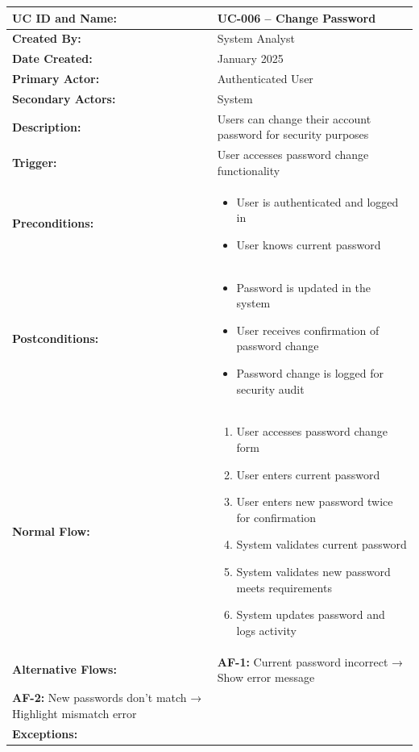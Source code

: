 \documentclass[12pt,a4paper]{article}
\begin{document}
\renewcommand{\arraystretch}{1.5}
\begin{longtable}{|p{4.5cm}|p{10.5cm}|}
\hline
\textbf{UC ID and Name:} & UC-006 – Change Password \\
\hline
\textbf{Created By:} & System Analyst \\
\hline
\textbf{Date Created:} & January 2025 \\
\hline
\textbf{Primary Actor:} & Authenticated User \\
\hline
\textbf{Secondary Actors:} & System \\
\hline
\textbf{Description:} & Users can change their account password for security purposes \\
\hline
\textbf{Trigger:} & User accesses password change functionality \\
\hline
\textbf{Preconditions:} &
\begin{itemize}
  \item User is authenticated and logged in
  \item User knows current password
\end{itemize} \\
\hline
\textbf{Postconditions:} &
\begin{itemize}
  \item Password is updated in the system
  \item User receives confirmation of password change
  \item Password change is logged for security audit
\end{itemize} \\
\hline
\textbf{Normal Flow:} &
\begin{enumerate}
  \item User accesses password change form
  \item User enters current password
  \item User enters new password twice for confirmation
  \item System validates current password
  \item System validates new password meets requirements
  \item System updates password and logs activity
\end{enumerate} \\
\hline
\textbf{Alternative Flows:} &
\textbf{AF-1:} Current password incorrect → Show error message \\
\textbf{AF-2:} New passwords don't match → Highlight mismatch error \\
\hline
\textbf{Exceptions:} &

\end{longtable}
\end{document}
